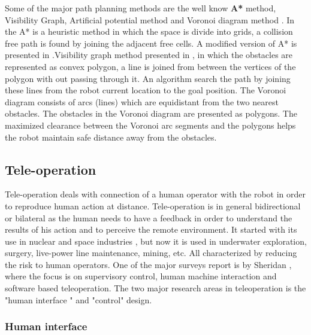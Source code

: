Some of the major path planning methods are the well know \textbf{A*} method, Visibility Graph, Artificial potential method and  Voronoi diagram method \cite{garrido2006voronoi}. In the A* \cite{latombe2012robot} is a heuristic method in which the space is divide into grids, a collision  free path is found by joining the adjacent free cells. A modified version of A* is presented in \cite{duchovn2014path}.Visibility graph method presented in \cite{nilsson1969mobile}, in which the obstacles are represented as convex polygon, a line is joined from between the vertices of the polygon with out passing through it. An algorithm search the path by joining these lines from the robot current location to the goal position. The Voronoi diagram \cite{latombe2012robot, bhattacharya2008roadmap, takahashi1989motion} consists of arcs (lines) which are equidistant from the two nearest obstacles. The obstacles in the Voronoi diagram are presented as polygons. The maximized clearance between the Voronoi arc segments and the polygons helps the robot maintain safe distance away from the obstacles.  
\subsection{Tele-operation}
Tele-operation deals with  connection of a   human operator with the robot in order to reproduce human action at distance. Tele-operation is in general bidirectional or bilateral as the human needs to have a feedback in order to understand the results of his action and to perceive the remote environment. It started with its use in nuclear and space industries \cite{martin1985teleoperated,vertut1986teleoperations}, but now it is used in underwater exploration, surgery, live-power line maintenance, mining, etc. All characterized by reducing the risk to human operators. One of the major surveys report is by Sheridan \cite{sheridan}, where the focus is on supervisory control, human machine interaction and software based teleoperation.  The two major research areas in teleoperation is the "human interface " and "control" design.
\subsubsection{Human interface}

